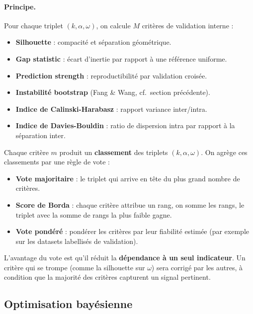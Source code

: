 \documentclass[11pt, a4paper]{article}
\begin{document}
\paragraph{Principe.}
Pour chaque triplet $(k, \alpha, \omega)$, on calcule $M$ critères
de validation interne :
\begin{itemize}[nosep]
  \item \textbf{Silhouette} : compacité et séparation géométrique.
  \item \textbf{Gap statistic} \cite{tibshirani2001} : écart d'inertie
    par rapport à une référence uniforme.
  \item \textbf{Prediction strength} \cite{tibshirani2005} :
    reproductibilité par validation croisée.
  \item \textbf{Instabilité bootstrap} (Fang \& Wang, cf.\ section précédente).
  \item \textbf{Indice de Calinski-Harabasz} \cite{calinski1974} : rapport variance
    inter/intra.
  \item \textbf{Indice de Davies-Bouldin} \cite{davies1979} : ratio de dispersion intra par
    rapport à la séparation inter.
\end{itemize}

Chaque critère $m$ produit un \textbf{classement} des triplets
$(k, \alpha, \omega)$. On agrège ces classements par une règle de vote :

\begin{itemize}[nosep]
  \item \textbf{Vote majoritaire} : le triplet qui arrive en tête du plus
    grand nombre de critères.
  \item \textbf{Score de Borda} : chaque critère attribue un rang, on somme
    les rangs, le triplet avec la somme de rangs la plus faible gagne.
  \item \textbf{Vote pondéré} : pondérer les critères par leur fiabilité
    estimée (par exemple sur les datasets labellisés de validation).
\end{itemize}

L'avantage du vote est qu'il réduit la \textbf{dépendance à un seul
indicateur}. Un critère qui se trompe (comme la silhouette sur $\omega$)
sera corrigé par les autres, à condition que la majorité des critères
capturent un signal pertinent.

\subsection{Optimisation bayésienne}
\end{document}
